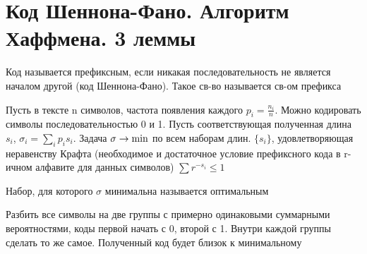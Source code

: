 \documentclass[discrete.tex]{subfiles}
\begin{document}
  \section{Код Шеннона-Фано. Алгоритм Хаффмена. 3 леммы}

  \begin{definition}
    Код называется префиксным, если никакая последовательность не является началом другой (код Шеннона-Фано). Такое св-во называется св-ом префикса
  \end{definition}

  \begin{task}
    Пусть в тексте n символов, частота появления каждого $p_i = \frac{n_i}{n}$. Можно кодировать символы последовательностью 0 и 1. Пусть соответствующая полученная длина $s_i$, $\sigma_i = \sum_i p_i s_i$. Задача $\sigma \rightarrow \min$ по всем наборам длин. $\{s_i\}$, удовлетворяющая неравенству Крафта (необходимое и достаточное условие префиксного кода в r-ичном алфавите для данных символов) $\sum r^{-s_i} \leq 1$
  \end{task}

  \begin{definition}
    Набор, для которого $\sigma$ минимальна называется оптимальным
  \end{definition}

  \begin{sol}
    Разбить все символы на две группы с примерно одинаковыми суммарными вероятностями, коды первой начать с 0, второй с 1. Внутри каждой группы сделать то же самое. Полученный код будет близок к минимальному
  \end{sol}
\end{document}
